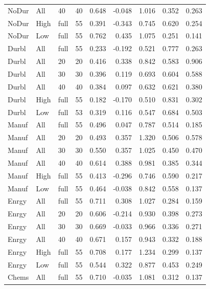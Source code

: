 \documentclass[10pt]{article}
\begin{document}
\begin{landscape}
\begin{longtable}{lllrrrrrr}
NoDur & All & 40 & 40 & 0.648 & -0.048 & 1.016 & 0.352 & 0.263 \\
NoDur & High & full & 55 & 0.391 & -0.343 & 0.745 & 0.620 & 0.254 \\
NoDur & Low & full & 55 & 0.762 & 0.435 & 1.075 & 0.251 & 0.141 \\
Durbl & All & full & 55 & 0.233 & -0.192 & 0.521 & 0.777 & 0.263 \\
Durbl & All & 20 & 20 & 0.416 & 0.338 & 0.842 & 0.583 & 0.906 \\
Durbl & All & 30 & 30 & 0.396 & 0.119 & 0.693 & 0.604 & 0.588 \\
Durbl & All & 40 & 40 & 0.384 & 0.097 & 0.632 & 0.621 & 0.380 \\
Durbl & High & full & 55 & 0.182 & -0.170 & 0.510 & 0.831 & 0.302 \\
Durbl & Low & full & 53 & 0.319 & 0.116 & 0.547 & 0.684 & 0.503 \\
Manuf & All & full & 55 & 0.496 & 0.047 & 0.787 & 0.514 & 0.185 \\
Manuf & All & 20 & 20 & 0.493 & 0.357 & 1.320 & 0.506 & 0.578 \\
Manuf & All & 30 & 30 & 0.550 & 0.357 & 1.025 & 0.450 & 0.470 \\
Manuf & All & 40 & 40 & 0.614 & 0.388 & 0.981 & 0.385 & 0.344 \\
Manuf & High & full & 55 & 0.413 & -0.296 & 0.746 & 0.590 & 0.217 \\
Manuf & Low & full & 55 & 0.464 & -0.038 & 0.842 & 0.558 & 0.137 \\
Enrgy & All & full & 55 & 0.711 & 0.308 & 1.027 & 0.284 & 0.159 \\
Enrgy & All & 20 & 20 & 0.606 & -0.214 & 0.930 & 0.398 & 0.273 \\
Enrgy & All & 30 & 30 & 0.669 & -0.033 & 0.966 & 0.336 & 0.271 \\
Enrgy & All & 40 & 40 & 0.671 & 0.157 & 0.943 & 0.332 & 0.188 \\
Enrgy & High & full & 55 & 0.708 & 0.177 & 1.234 & 0.299 & 0.137 \\
Enrgy & Low & full & 55 & 0.544 & 0.322 & 0.877 & 0.453 & 0.249 \\
Chems & All & full & 55 & 0.710 & -0.035 & 1.081 & 0.312 & 0.137 \\
\end{longtable}


\end{landscape}
\end{document}
